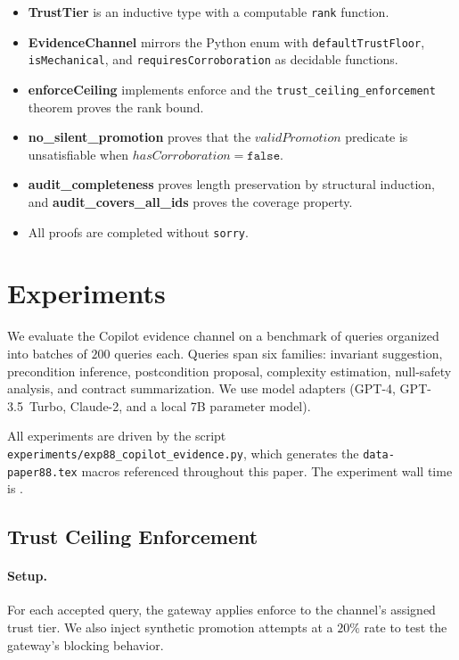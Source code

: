 \documentclass[11pt]{article}
\newcommand{\enforce}{\mathrm{enforce}}
\begin{document}
\begin{itemize}
\item \textbf{TrustTier} is an inductive type with a
  computable \texttt{rank} function.
\item \textbf{EvidenceChannel} mirrors the Python enum with
  \texttt{defaultTrustFloor}, \texttt{isMechanical}, and
  \texttt{requiresCorroboration} as decidable functions.
\item \textbf{enforceCeiling} implements $\enforce$ and the
  \texttt{trust\_ceiling\_enforcement} theorem proves the
  rank bound.
\item \textbf{no\_silent\_promotion} proves that the
  $\mathit{validPromotion}$ predicate is unsatisfiable when
  $\mathit{hasCorroboration} = \texttt{false}$.
\item \textbf{audit\_completeness} proves length preservation
  by structural induction, and \textbf{audit\_covers\_all\_ids}
  proves the coverage property.
\item All proofs are completed without \texttt{sorry}.
\end{itemize}

\section{Experiments}
\label{sec:experiments}

We evaluate the Copilot evidence channel on a benchmark of
\ppLXXXVIIItotalQueries{} queries organized into
\ppLXXXVIIIqueryBatches{} batches of $200$ queries each.
Queries span six families: invariant suggestion, precondition
inference, postcondition proposal, complexity estimation,
null-safety analysis, and contract summarization.  We use
\ppLXXXVIIIadapterCount{} model adapters (GPT-4, GPT-3.5~Turbo,
Claude-2, and a local 7B parameter model).

All experiments are driven by the script
\texttt{experiments/exp88\_copilot\_evidence.py}, which
generates the \texttt{data-paper88.tex} macros referenced
throughout this paper.  The experiment wall time is
\ppLXXXVIIItimeTotal.

\subsection{Trust Ceiling Enforcement}
\label{sec:exp:ceiling}

\paragraph{Setup.}
For each accepted query, the gateway applies $\enforce$ to the
channel's assigned trust tier.  We also inject synthetic
promotion attempts at a $20\%$ rate to test the gateway's
blocking behavior.
\end{document}
